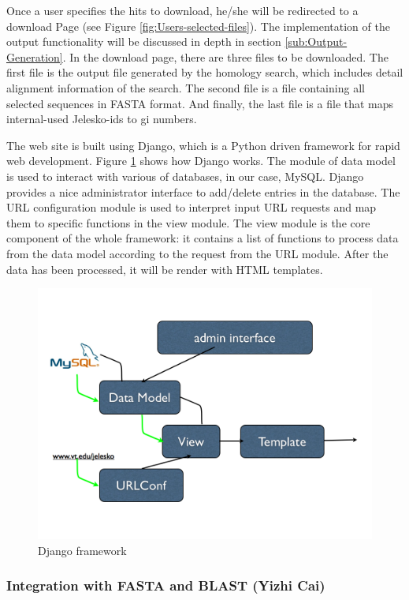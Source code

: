 \documentclass[11pt,letterpaper,twoside,english]{article}
\begin{document}
Once a user specifies the hits to download, he/she will be redirected
to a download Page (see Figure \ref{fig:Users-selected-files}). The
implementation of the output functionality will be discussed in depth
in section \ref{sub:Output-Generation}. In the download page, there
are three files to be downloaded. The first file is the output file
generated by the homology search, which includes detail alignment
information of the search. The second file is a file containing all
selected sequences in FASTA format. And finally, the last file is
a file that maps internal-used Jelesko-ids to gi numbers.

The web site is built using Django, which is a Python driven framework
for rapid web development. Figure \ref{fig:Django-framework} shows
how Django works. The module of data model is used to interact with
various of databases, in our case, MySQL. Django provides a nice administrator
interface to add/delete entries in the database. The URL configuration
module is used to interpret input URL requests and map them to specific
functions in the view module. The view module is the core component
of the whole framework: it contains a list of functions to process
data from the data model according to the request from the URL module.
After the data has been processed, it will be render with HTML templates.

\begin{figure}[h]
\begin{center}
\includegraphics[width=0.6\linewidth]{figures/Django}
\end{center}

\caption{\label{fig:Django-framework}Django framework}

\end{figure}

\subsubsection{\label{sub:Integration-with-FASTA}Integration with FASTA and
BLAST (Yizhi Cai)}
\end{document}
